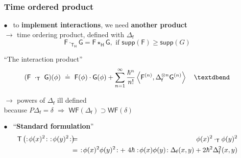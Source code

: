 \documentclass[9pt]{beamer}
\newcommand{\Tdot}{\cdot_\Tsf} %
\newcommand{\TdotH}{\cdot_{\Tsf_\Hsf}} %
\newcommand{\Smearip}[1]{\left\langle #1 \right\rangle} %
\newcommand{\Wick}[1]{:\!{#1}\!:} %
\newcommand{\WF}{\mathsf{WF}} %
\newcommand{\supp}{\mathsf{supp}} %
\newcommand{\Fsf}{\mathsf{F}}
\newcommand{\Gsf}{\mathsf{G}}
\newcommand{\Hsf}{\mathsf{H}}
\newcommand{\Tsf}{\mathsf{T}}
\newcommand{\fsf}{\mathsf{f}}
\begin{document}
\begin{frame}

\frametitle{Time ordered product}

\vfill

$\bullet$ \ to \textbf{implement interactions}, we need \textbf{another product} \\
\hspace*{8pt} $\to$ time ordering product, defined with $\Delta_\fsf$ 
\vspace*{-8pt}
\begin{equation*}
\Fsf \TdotH \Gsf = \Fsf \star_\Hsf \Gsf, \mbox{ if } \supp(\Fsf) \geq \supp(G)
\end{equation*}

\begin{block}{``The interaction product''}
\vspace*{-13pt}
\begin{equation*}
(\Fsf \ \Tdot \ \Gsf)(\phi) \ \doteq \ \Fsf(\phi) \cdot \Gsf(\phi) + \sum_{n=1}^{\infty} \frac{\hbar^n}{n!} \Smearip{\Fsf^{(n)},\Delta_{\fsf}^{\otimes n} \Gsf^{(n)}} \quad \textdbend  
\vspace*{-6pt}
\end{equation*}
\end{block}

\hspace*{8pt} $\to$ powers of $\Delta_\fsf$ ill defined \\
\hspace*{20pt} because $P \Delta_\fsf = \delta$ $\Rightarrow$ $\WF(\Delta_\fsf) \supset \WF(\delta)$ \\

\vfill

$\bullet$ \ ``\textbf{Standard formulation}'' \\[-20pt]
%
\begin{eqnarray*}
\Tsf \left( \Wick{\phi(x)^2} \ \Wick{\phi(y)^2} \right) \hspace*{-6pt} &=& \hspace*{-6pt} \phi(x)^2 \Tdot \phi(y)^2 \\ 
&=& \hspace*{-6pt} \Wick{\phi(x)^2 \phi(y)^2} + \ 4 \hbar \Wick{\phi(x) \phi(y)} \Delta_\fsf(x,y) + 2 \hbar^2 \Delta^2_\fsf(x,y)
\end{eqnarray*}

\vfill

\end{frame}  

\end{document}
